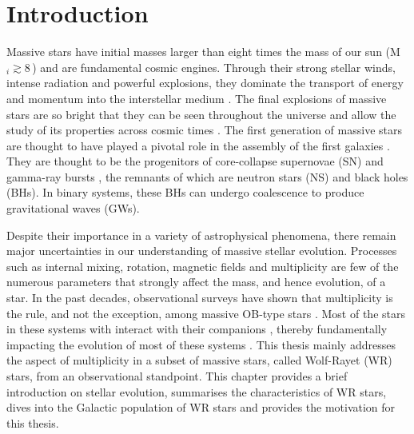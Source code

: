 \chapter{Introduction}\label{ch:introduction}


Massive stars have initial masses larger than eight times the mass of our sun (M$_i \gtrsim 8$\,\Msun{}) and are fundamental cosmic engines. Through their strong stellar winds, intense radiation and powerful explosions, they dominate the transport of energy and momentum into the interstellar medium \citep[c.f.][]{mac_low_distribution_2005}. The final explosions of massive stars are so bright that they can be seen throughout the universe and allow the study of its properties across cosmic times \citep{tanvir_-ray_2009}. The first generation of massive stars are thought to have played a pivotal role in the assembly of the first galaxies \citep{bromm_first_2004,robertson_early_2010}. They are thought to be the progenitors of core-collapse supernovae (SN) and gamma-ray bursts \citep{woosley_supernova_2006}, the remnants of which are neutron stars (NS) and black holes (BHs). In binary systems, these BHs can undergo coalescence to produce gravitational waves (GWs).

Despite their importance in a variety of astrophysical phenomena, there remain major uncertainties in our understanding of massive stellar evolution. Processes such as internal mixing, rotation, magnetic fields and multiplicity are few of the numerous parameters that strongly affect the mass, and hence evolution, of a star. In the past decades, observational surveys have shown that multiplicity is the rule, and not the exception, among massive OB-type stars \citep{mason_iccd_1998,mason_high_2009,sana_binary_2012,sana_vlt-flames_2013,sana_southern_2014,kobulnicky_toward_2014,barba_own_2014,dunstall_vlt-flames_2015,maiz_apellaniz_galactic_2016,maiz_apellaniz_monos_2019,almeida_tarantula_2017,banyard_observed_2022,villasenor_b-type_2021}. Most of the stars in these systems with interact with their companions \citep{fryer_constraints_2007,sana_binary_2012,sana_vlt-flames_2013,dunstall_vlt-flames_2015}, thereby fundamentally impacting the evolution of most of these systems \citep{pols_case_1994}. This thesis mainly addresses the aspect of multiplicity in a subset of massive stars, called Wolf-Rayet (WR) stars, from an observational standpoint. This chapter provides a brief introduction on stellar evolution, summarises the characteristics of WR stars, dives into the Galactic population of WR stars and provides the motivation for this thesis.

